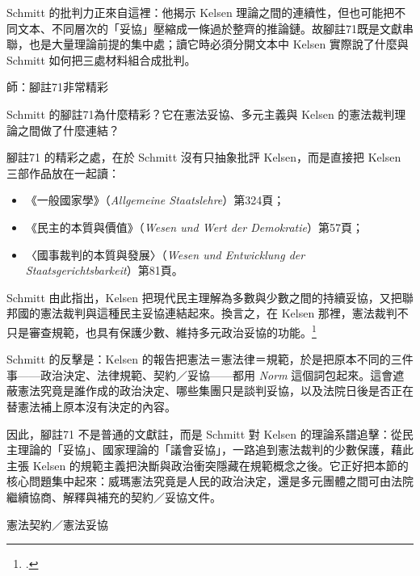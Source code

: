 Schmitt 的批判力正來自這裡：他揭示 Kelsen 理論之間的連續性，但也可能把不同文本、不同層次的「妥協」壓縮成一條過於整齊的推論鏈。故腳註71既是文獻串聯，也是大量理論前提的集中處；讀它時必須分開文本中 Kelsen 實際說了什麼與Schmitt 如何把三處材料組合成批判。


\begin{qaprompt}
師：腳註71非常精彩
\end{qaprompt}

\begin{qaquestion}
Schmitt 的腳註71為什麼精彩？它在憲法妥協、多元主義與 Kelsen 的憲法裁判理論之間做了什麼連結？
\end{qaquestion}

腳註71 的精彩之處，在於 Schmitt 沒有只抽象批評 Kelsen，而是直接把 Kelsen 三部作品放在一起讀：

\begin{itemize}
\tightlist
\item
  《一般國家學》（\emph{Allgemeine Staatslehre}）第324頁；
\item
  《民主的本質與價值》（\emph{Wesen und Wert der Demokratie}）第57頁；
\item
  〈國事裁判的本質與發展〉（\emph{Wesen und Entwicklung der Staatsgerichtsbarkeit}）第81頁。
\end{itemize}

Schmitt 由此指出，Kelsen 把現代民主理解為多數與少數之間的持續妥協，又把聯邦國的憲法裁判與這種民主妥協連結起來。換言之，在 Kelsen 那裡，憲法裁判不只是審查規範，也具有保護少數、維持多元政治妥協的功能。\footcites[123]{schmitt2015}[72]{kelsen2015}[81]{kelsen1929}

Schmitt 的反擊是：Kelsen 的報告把憲法＝憲法律＝規範，於是把原本不同的三件事------政治決定、法律規範、契約／妥協------都用 \emph{Norm} 這個詞包起來。這會遮蔽憲法究竟是誰作成的政治決定、哪些集團只是談判妥協，以及法院日後是否正在替憲法補上原本沒有決定的內容。

因此，腳註71 不是普通的文獻註，而是 Schmitt 對 Kelsen 的理論系譜追擊：從民主理論的「妥協」、國家理論的「議會妥協」，一路追到憲法裁判的少數保護，藉此主張 Kelsen 的規範主義把決斷與政治衝突隱藏在規範概念之後。它正好把本節的核心問題集中起來：威瑪憲法究竟是人民的政治決定，還是多元團體之間可由法院繼續協商、解釋與補充的契約／妥協文件。


\begin{qaprompt}
憲法契約／憲法妥協
\end{qaprompt}

